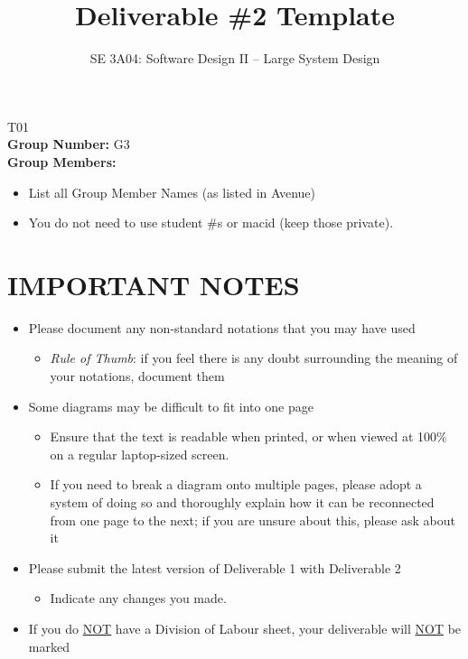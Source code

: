 \documentclass[]{article}
\title{Deliverable \#2 Template}
\author{SE 3A04: Software Design II -- Large System Design}
\date{}
\begin{document}
\maketitle	
{} T01\\
{\bf Group Number:} G3 \\
{\bf Group Members:} 
\begin{itemize}
	\item List all Group Member Names (as listed in Avenue)
	\item You do not need to use student \#s or macid (keep those private).
\end{itemize}

\section*{IMPORTANT NOTES}
\begin{itemize}
	\item Please document any non-standard notations that you may have used
	\begin{itemize}
		\item \emph{Rule of Thumb}: if you feel there is any doubt surrounding the meaning of your notations, document them
	\end{itemize}
	\item Some diagrams may be difficult to fit into one page
	\begin{itemize}
		\item Ensure that the text is readable when printed, or when viewed at 100\% on a regular laptop-sized screen.
		\item If you need to break a diagram onto multiple pages, please adopt a system of doing so and thoroughly explain how it can be reconnected from one page to the next; if you are unsure about this, please ask about it
	\end{itemize}
	\item Please submit the latest version of Deliverable 1 with Deliverable 2
	\begin{itemize}
		\item Indicate any changes you made.
	\end{itemize}
	\item If you do \underline{NOT} have a Division of Labour sheet, your deliverable will \underline{NOT} be marked
\end{itemize}
\end{document}

